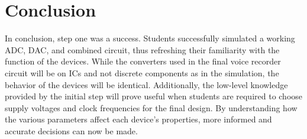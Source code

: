 \section{Conclusion}
In conclusion, step one was a success.  Students successfully simulated a
working ADC, DAC, and combined circuit, thus refreshing their familiarity with
the function of the devices.  While the converters used in the final voice
recorder circuit will be on ICs and not discrete components as in the
simulation, the behavior of the devices will be identical.  Additionally, the
low-level knowledge provided by the initial step will prove useful when
students are required to choose supply voltages and clock frequencies for the
final design.  By understanding how the various parameters affect each device's
properties, more informed and accurate decisions can now be made.
